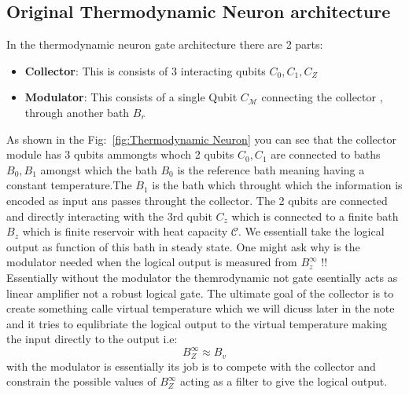 \documentclass[11pt,a4paper]{article}
\theoremstyle{definition}
\theoremstyle{remark}
\begin{document}
\subsection{Original Thermodynamic Neuron architecture}
In the thermodynamic neuron gate architecture there are 2 parts:
\begin{itemize}
    \item \textbf{Collector}: This is consists of 3 interacting qubits \(C_0 , C_1 , C_Z\)
    \item \textbf{Modulator}: This consists of a single Qubit \(C_\mathcal{M}\) connecting the collector , through another bath \(B_r\)
    \end{itemize}
    As shown in the Fig:~\ref{fig:Thermodynamic Neuron} you can see that the collector module has 3 qubits ammongts whoch 2 qubits \(C_0 , C_1\) are connected to baths \(B_0 , B_1\) amongst which the bath \(B_0\) is the reference bath meaning having a constant temperature.The \(B_1\) is the bath which throught which the information is encoded as input ans passes throught the collector.
    The 2 qubits are connected and directly interacting with the 3rd qubit \(C_z\) which is connected to a finite bath \(B_z\) which is finite reservoir with heat capacity \(\mathcal{C}\). We essentiall take the logical output as function of this bath in steady state.
    One might ask why is the modulator needed when the logical output is measured from  \(B_z^\infty\) !! \\ Essentially without the modulator the themrodynamic not gate esentially acts as linear amplifier not a robust logical gate. The ultimate goal of the collector is to create something calle virtual temperature which we will dicuss later in the note and it tries to equlibriate the logical output to the virtual temperature making the input directly to the output i.e:
    \[
    B_Z^\infty \approx B_v
    \] with the modulator is essentially its job is to compete with the collector and constrain the possible values of \(B_Z^\infty\) acting as a filter to give the logical output.
\end{document}
